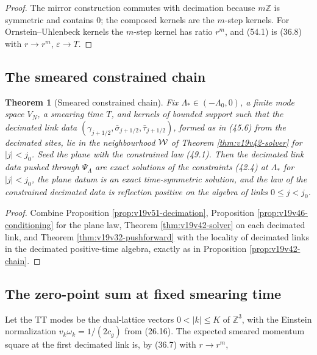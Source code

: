 \documentclass[11pt]{article}
\newtheorem{theorem}{Theorem}[section]
\theoremstyle{remark}
\begin{document}
\begin{proof}
The mirror construction commutes with decimation because
\(m\mathbb Z\) is symmetric and contains \(0\); the composed kernels are
the \(m\)-step kernels.  For Ornstein--Uhlenbeck kernels the \(m\)-step
kernel has ratio \(r^m\), and (54.1) is (36.8) with \(r\to r^m\),
\(\varepsilon\to T\).
\end{proof}

\subsection{The smeared constrained chain}

\begin{theorem}[Smeared constrained chain]
\label{thm:v19v51-chain}
Fix \(\Lambda_*\in(-\Lambda_0,0)\), a finite mode space \(V_N\), a
smearing time \(T\), and kernels of bounded support such that the
decimated link data
\((\gamma_{j+1/2},\bar\sigma_{j+1/2},\bar\tau_{j+1/2})\), formed as in
(45.6) from the decimated sites, lie in the neighbourhood \({\cal W}\)
of Theorem \ref{thm:v19v42-solver} for \(|j|<j_0\).  Seed the plane
with the constrained law (49.1).  Then the decimated link data pushed
through \(\Psi_\Lambda\) are exact solutions of the constraints (42.4)
at \(\Lambda_*\) for \(|j|<j_0\), the plane datum is an exact
time-symmetric solution, and the law of the constrained decimated data
is reflection positive on the algebra of links \(0\leq j<j_0\).
\end{theorem}

\begin{proof}
Combine Proposition \ref{prop:v19v51-decimation}, Proposition
\ref{prop:v19v46-conditioning} for the plane law, Theorem
\ref{thm:v19v42-solver} on each decimated link, and Theorem
\ref{thm:v19v32-pushforward} with the locality of decimated links in
the decimated positive-time algebra, exactly as in Proposition
\ref{prop:v19v42-chain}.
\end{proof}

\subsection{The zero-point sum at fixed smearing time}

Let the TT modes be the dual-lattice vectors \(0<|k|\leq K\) of
\(\mathbb Z^3\), with the Einstein normalization
\(v_k\omega_k=1/(2c_g)\) from (26.16).  The expected smeared momentum
square at the first decimated link is, by (36.7) with \(r\to r^m\),
\end{document}
